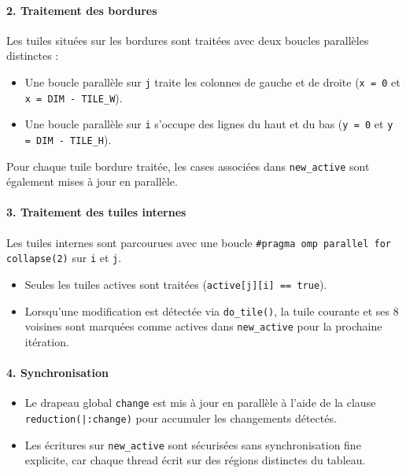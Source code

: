 \documentclass[a4paper,12pt]{article}
\begin{document}
\paragraph{2. Traitement des bordures}

Les tuiles situées sur les bordures sont traitées avec deux boucles parallèles distinctes :
\begin{itemize}
  \item Une boucle parallèle sur \texttt{j} traite les colonnes de gauche et de droite (\texttt{x = 0} et \texttt{x = DIM - TILE\_W}).
  \item Une boucle parallèle sur \texttt{i} s’occupe des lignes du haut et du bas (\texttt{y = 0} et \texttt{y = DIM - TILE\_H}).
\end{itemize}
Pour chaque tuile bordure traitée, les cases associées dans \texttt{new\_active} sont également mises à jour en parallèle.

\paragraph{3. Traitement des tuiles internes}

Les tuiles internes sont parcourues avec une boucle \texttt{\#pragma omp parallel for collapse(2)} sur \texttt{i} et \texttt{j}. 
\begin{itemize}
  \item Seules les tuiles actives sont traitées (\texttt{active[j][i] == true}).
  \item Lorsqu’une modification est détectée via \texttt{do\_tile()}, la tuile courante et ses 8 voisines sont marquées comme actives dans \texttt{new\_active} pour la prochaine itération.
\end{itemize}

\paragraph{4. Synchronisation}

\begin{itemize}
  \item Le drapeau global \texttt{change} est mis à jour en parallèle à l’aide de la clause \texttt{reduction(|:change)} pour accumuler les changements détectés.
  \item Les écritures sur \texttt{new\_active} sont sécurisées sans synchronisation fine explicite, car chaque thread écrit sur des régions distinctes du tableau.
\end{itemize}
\end{document}
